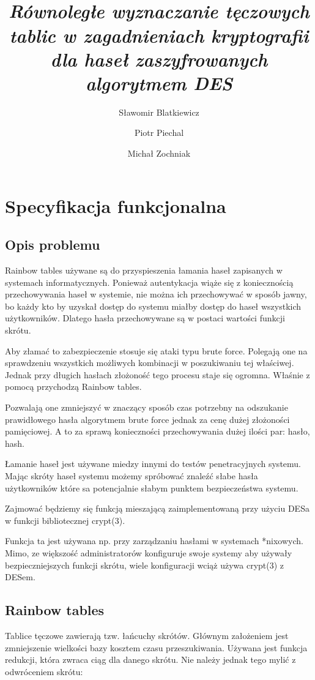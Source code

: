 \documentclass[a4paper,11pt]{article}
\title{ \sc{Programowanie Równoległe i Rozproszone} \\
\emph{Równoległe wyznaczanie tęczowych tablic w zagadnieniach kryptografii dla haseł zaszyfrowanych algorytmem DES} }
\author{Sławomir Blatkiewicz
\and Piotr Piechal
\and Michał Zochniak}
\begin{document}
\maketitle
\tableofcontents

\section{Specyfikacja funkcjonalna}

\subsection{Opis problemu}
Rainbow tables używane są do przyspieszenia łamania haseł zapisanych w systemach informatycznych. Ponieważ autentykacja wiąże się z koniecznością przechowywania haseł w systemie, nie można ich przechowywać w sposób jawny, bo każdy kto by uzyskał dostęp do systemu miałby dostęp do haseł wszystkich użytkowników. Dlatego hasła przechowywane są w postaci wartości funkcji skrótu.

Aby złamać to zabezpieczenie stosuje się ataki typu brute force. Polegają one na sprawdzeniu wszystkich możliwych kombinacji w poszukiwaniu tej właściwej. Jednak przy długich hasłach złożoność tego procesu staje się ogromna. Właśnie z pomocą przychodzą Rainbow tables.

Pozwalają one zmniejszyć w znaczący sposób czas potrzebny na odszukanie prawidłowego hasła algorytmem brute force jednak za cenę dużej złożoności pamięciowej. A to za sprawą konieczności przechowywania dużej ilości par: hasło, hash.

Łamanie haseł jest używane miedzy innymi do testów penetracyjnych systemu. Mając skróty haseł systemu możemy spróbować znaleźć słabe hasła użytkowników które sa potencjalnie słabym punktem bezpieczeństwa systemu.

Zajmować będziemy się funkcją mieszającą zaimplementowaną przy użyciu DESa w funkcji bibliotecznej crypt(3).

Funkcja ta jest używana np. przy zarządzaniu hasłami w systemach *nixowych. Mimo, ze większość administratorów konfiguruje swoje systemy aby używały bezpieczniejszych funkcji skrótu, wiele konfiguracji wciąż używa crypt(3) z DESem.


\subsection{Rainbow tables}
Tablice tęczowe zawierają tzw. łańcuchy skrótów. Głównym założeniem jest zmniejszenie wielkości bazy kosztem czasu przeszukiwania. Używana jest funkcja redukcji, która zwraca ciąg dla danego skrótu. Nie należy jednak tego mylić z odwróceniem skrótu:
\end{document}
